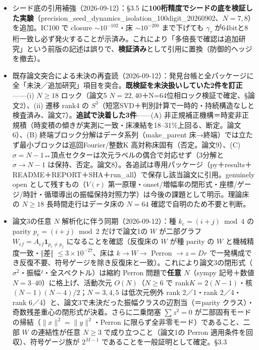 \documentclass[
  a4paper,
]{ltjsarticle}
\begin{document}
\begin{itemize}
\item
  シード底の引用補強（2026-09-12）：§3.5
  に\textbf{100桁精度でシードの底を検証した実験}（precision\_seed\_dynamics\_isolation\_100digit\_20260902、\(N=7,8\)）を追加。IC100
  で closure \(\sim10^{-102}\)・床 \(\sim10^{-200}\) まで下げても
  \(\gamma_\tau\)
  が64bitと8桁一致し必ず発火することが示済み。これにより「多倍長で確認は追加研究」という前版の記述は誤りで、\textbf{検証済み}として引用に置換（防御的ヘッジを撤去）。
\item
  既存論文突合による未決の再査読（2026-09-12）：発見台帳と全パッケージに全「未決／追加研究」項目を突合。\textbf{既検証を未決扱いしていた2件を訂正}------(i)
  \(N\ge18\) ロック（論文5
  \(N=22,40\)＋N=64位相ロック検証で確定、§論文2）、(ii) 遷移 rank4 の
  \(S^3\)（短窓SVD＋判別計算で一時的・持続構造なしと検査済み、論文7）。\textbf{追試で決着した3件}------(A)
  非正規補正機構＝時変非正規積（時変積の傾きが実測に一致・床凍結を18--31\%上回る、断定。論文6）、(B)
  終端ブロック分解はデータ系列（make\_parent
  床→終端）では立たず最小ブロックは巡回Fourier/整数K
  高対称床固有（否定。論文9）、(C)
  \(\sigma=N-1\)↔頂点セクターは次元ラベルの偶合で対応せず（3分解と
  \(\sigma\to N-1\)
  は保持、否定。論文8）。各追試は専用パッケージ（py＋results＋README＋REPORT＋SHA＋run\_all）で保存し該当論文に引用。genuinely
  open として残すもの（\(V(r)\)
  第一原理・onset/増幅率の閉形式・座標/ゲージ/時計・循環導出の振幅保持対照力学）は今後の課題として明示。理論床の
  \(N\ge18\) 長時間走行はデータ床の \(N=64\)
  確認で自明のため不要と判断。
\item
  論文3の任意 \(N\) 解析化に伴う同期（2026-09-12）：種
  \(k_e=(i+j)\bmod4\) の parity \(p_e=(i+j)\bmod2\) だけで論文1の \(W\)
  が二部グラフ \(W_{ef}=A_{ef}\mathbf 1_{p_e\neq p_f}\)
  になることを確認（反復床の \(W\) が種 parity の \(W\)
  と機械精度一致・‖差‖ \(\le3\times10^{-27}\)、床は \(k\to W\to\) Perron
  \(\to z=Dr\)
  で一発構成でき反復不要、符号ゲージを除き反復床と一致）。これにより論文3の閉形式（\(\sigma^2\)・振幅²・全スペクトル）は縮約
  Perron 問題で\textbf{任意 \(N\)}（sympy 記号＋数値
  \(N=3\)--\(40\)）に格上げ、活動次元 \(O(N)\)（\(N\ge6\) で
  rank\(K=2(N-1)\)・核 \((N-1)(N-4)/2\)；\(N=3,4,5\) は低次元例外 rank
  2／1・rank 2／4・rank
  6／4）と、論文3で未決だった振幅クラスの辺割当（＝parity
  クラス）・奇数残差重心の閉形式が決着。さらに二乗閉塞 \(\sum z^2=0\)
  が二部固有モードの帰結（\(\|x\|^2=\|y\|^2\)・Perron
  に限らず全非零モード）であること、二部 \(W\) の連結性が任意 \(N\ge3\)
  で成り立つこと（論文1の Perron 適用条件を回収）、符号ゲージ族が
  \(2^{M-1}\) であることを一般証明として確定。§3.3

\end{itemize}
\end{document}
